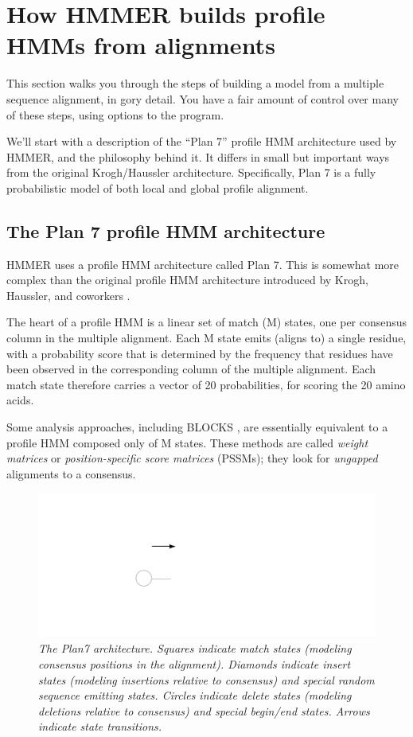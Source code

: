 \section{How HMMER builds profile HMMs from alignments}

This section walks you through the steps of building a model from a
multiple sequence alignment, in gory detail. You have a fair amount of
control over many of these steps, using options to the 
program.

We'll start with a description of the ``Plan 7'' profile HMM
architecture used by HMMER, and the philosophy behind it. It differs
in small but important ways from the original Krogh/Haussler
architecture. Specifically, Plan 7 is a fully probabilistic model of
both local and global profile alignment.

\subsection{The Plan 7 profile HMM architecture}

HMMER uses a profile HMM architecture called Plan 7. This is somewhat
more complex than the original profile HMM architecture introduced by
Krogh, Haussler, and coworkers \cite{Krogh94}.

The heart of a profile HMM is a linear set of match (M) states, one
per consensus column in the multiple alignment. Each M state emits
(aligns to) a single residue, with a probability score that is
determined by the frequency that residues have been observed in the
corresponding column of the multiple alignment. Each match state
therefore carries a vector of 20 probabilities, for scoring the 20
amino acids.

Some analysis approaches, including BLOCKS \cite{Henikoff94}, are
essentially equivalent to a profile HMM composed only of M states.
These methods are called \emph{weight matrices} or
\emph{position-specific score matrices} (PSSMs); they look for
\emph{ungapped} alignments to a consensus.

\begin{figure}[t]
\includegraphics{plan7}
\caption{\textit{The Plan7 architecture. Squares indicate match states
(modeling consensus positions in the alignment). Diamonds indicate
insert states (modeling insertions relative to consensus) and special
random sequence emitting states. Circles indicate delete states
(modeling deletions relative to consensus) and special begin/end
states. Arrows indicate state transitions.}}
\end{figure}

